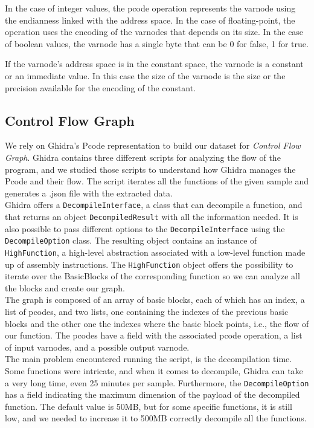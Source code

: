 In the case of integer values, the pcode operation represents the varnode using the endianness linked with the address space.
In the case of floating-point, the operation uses the encoding of the varnodes that depends on its size.
In the case of boolean values, the varnode has a single byte that can be 0 for false, 1 for true.

If the varnode's address space is in the constant space, the varnode is a constant or an immediate value. In this case the size of the varnode is the size or the precision available for the encoding of the constant.



\subsection{Control Flow Graph}

We rely on Ghidra's Pcode representation to build our dataset for \textit{Control Flow Graph}. Ghidra contains three different scripts for analyzing the flow of the program, and we studied those scripts to understand how Ghidra manages the Pcode and their flow. The script iterates all the functions of the given sample and generates a .json file with the extracted data.\\

Ghidra offers a \texttt{DecompileInterface}, a class that can decompile a function, and that returns an object \texttt{DecompiledResult} with all the information needed. It is also possible to pass different options to the \texttt{DecompileInterface} using the \texttt{DecompileOption} class. The resulting object contains an instance of \texttt{HighFunction}, a high-level abstraction associated with a low-level function made up of assembly instructions. The \texttt{HighFunction} object offers the possibility to iterate over the BasicBlocks of the corresponding function so we can analyze all the blocks and create our graph.\\

The graph is composed of an array of basic blocks, each of which has an index, a list of pcodes, and two lists, one containing the indexes of the previous basic blocks and the other one the indexes where the basic block points, i.e., the flow of our function. The pcodes have a field with the associated pcode operation, a list of input varnodes, and a possible output varnode. \\

The main problem encountered running the script, is the decompilation time. Some functions were intricate, and when it comes to decompile, Ghidra can take a very long time, even 25 minutes per sample.  Furthermore, the \texttt{DecompileOption} has a field indicating the maximum dimension of the payload of the decompiled function. The default value is 50MB, but for some specific functions, it is still low, and we needed to increase it to 500MB correctly decompile all the functions.

